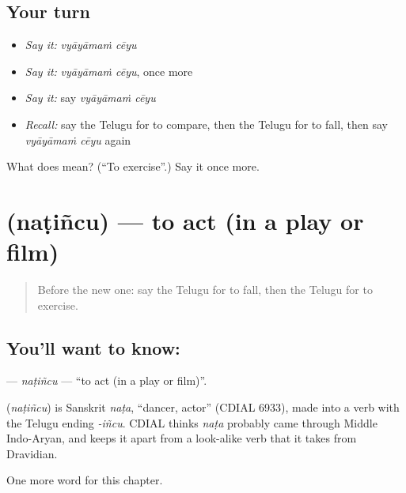 \subsection*{Your turn}
\begin{itemize}
\raggedright
  \item \emph{Say it:} \emph{vyāyāmaṁ cēyu}
  \item \emph{Say it:} \emph{vyāyāmaṁ cēyu}, once more
  \item \emph{Say it:} say \emph{vyāyāmaṁ cēyu}
  \item \emph{Recall:} say the Telugu for to compare, then the Telugu for to fall, then say \emph{vyāyāmaṁ cēyu} again
\end{itemize}

\begin{tcolorbox}[breakable,colback=teal!4,colframe=teal!35!black,title={Before you move on}]
What does   mean? (\textquotedblleft{}To exercise\textquotedblright{}.) Say it once more.
\end{tcolorbox}
\section[\texorpdfstring{\te{నటించు} (naṭiñcu)}{నటించు (naṭiñcu)}]{ (naṭiñcu) — to act (in a play or film)}

\label{lesson:TE-C204-natincu}



\begin{quote}
Before the new one: say the Telugu for to fall, then the Telugu for to exercise.
\end{quote}

\subsection*{You'll want to know: }
\textbf{} — \emph{naṭiñcu} — \textquotedblleft{}to act (in a play or film)\textquotedblright{}.

\begin{cousinweb}
\textbf{} (\emph{naṭiñcu}) is Sanskrit \emph{naṭa}, \textquotedblleft{}dancer, actor\textquotedblright{} (CDIAL 6933), made into a verb with the Telugu ending \emph{-iñcu}. CDIAL thinks \emph{naṭa} probably came through Middle Indo-Aryan, and keeps it apart from a look-alike verb that it takes from Dravidian.
\end{cousinweb}

\begin{grammarlens}[title={What you've built}]
One more word for this chapter.
\end{grammarlens}

